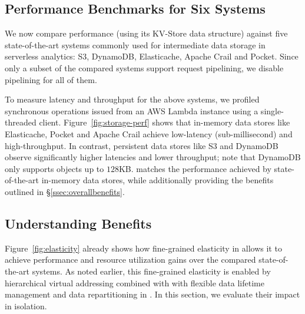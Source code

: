 \subsection{Performance Benchmarks for Six Systems}
\label{ssec:hrelated}

We now compare \jiffy performance (using its KV-Store data structure) against five state-of-the-art systems commonly used for intermediate data storage in serverless analytics: S3, DynamoDB, Elasticache, Apache Crail and Pocket. Since only a subset of the compared systems support request pipelining, we disable pipelining for all of them. %



To measure latency and throughput for the above systems, we profiled synchronous operations issued from an AWS Lambda instance using a single-threaded client. Figure~\ref{fig:storage-perf} shows that in-memory data stores like Elasticache, Pocket and Apache Crail achieve low-latency (sub-millisecond) and high-throughput. In contrast, persistent data stores like S3 and DynamoDB observe significantly higher latencies and lower throughput; note that DynamoDB only supports objects up to $128$KB. \jiffy matches the performance achieved by state-of-the-art in-memory data stores, while additionally providing the benefits outlined in \S\ref{ssec:overallbenefits}.


\subsection{Understanding \jiffy Benefits}
\label{ssec:benefits}

Figure~\ref{fig:elasticity} already shows how fine-grained elasticity in \jiffy allows it to achieve performance and resource utilization gains over the compared state-of-the-art systems. As noted earlier, this fine-grained elasticity is enabled by hierarchical virtual addressing combined with with flexible data lifetime management and data repartitioning in \jiffy. In this section, we evaluate their impact in isolation.

